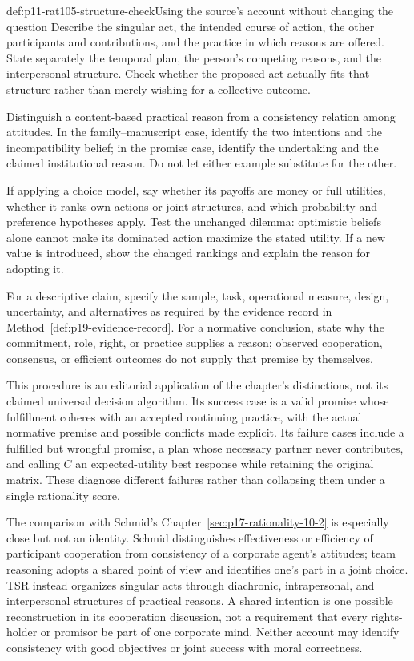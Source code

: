 \begin{hbmethod}{def:p11-rat105-structure-check}{Using the source's account without changing the question}
Describe the singular act, the intended course of action, the other
participants and contributions, and the practice in which reasons are
offered. State separately the temporal plan, the person's competing
reasons, and the interpersonal structure. Check whether the proposed
act actually fits that structure rather than merely wishing for a
collective outcome.

Distinguish a content-based practical reason from a consistency relation
among attitudes. In the family--manuscript case, identify the two
intentions and the incompatibility belief; in the promise case, identify
the undertaking and the claimed institutional reason. Do not let either
example substitute for the other.

If applying a choice model, say whether its payoffs are money or full
utilities, whether it ranks own actions or joint structures, and which
probability and preference hypotheses apply. Test the unchanged
dilemma: optimistic beliefs alone cannot make its dominated action
maximize the stated utility. If a new value is introduced, show the
changed rankings and explain the reason for adopting it.

For a descriptive claim, specify the sample, task, operational measure,
design, uncertainty, and alternatives as required by the evidence record
in Method~\ref{def:p19-evidence-record}. For a normative conclusion,
state why the commitment, role, right, or practice supplies a reason;
observed cooperation, consensus, or efficient outcomes do not supply
that premise by themselves.
\end{hbmethod}

This procedure is an editorial application of the chapter's distinctions,
not its claimed universal decision algorithm. Its success case is a
valid promise whose fulfillment coheres with an accepted continuing
practice, with the actual normative premise and possible conflicts
made explicit. Its failure cases include a fulfilled but wrongful
promise, a plan whose necessary partner never contributes, and calling
\(C\) an expected-utility best response while retaining the original
matrix. These diagnose different failures rather than collapsing them
under a single rationality score.

The comparison with Schmid's
Chapter~\ref{sec:p17-rationality-10-2} is especially close but not an
identity. Schmid distinguishes effectiveness or efficiency of participant
cooperation from consistency of a corporate agent's attitudes; team
reasoning adopts a shared point of view and identifies one's part in a
joint choice. TSR instead organizes singular acts through diachronic,
intrapersonal, and interpersonal structures of practical reasons. A
shared intention is one possible reconstruction in its cooperation
discussion, not a requirement that every rights-holder or promisor be
part of one corporate mind. Neither account may identify consistency
with good objectives or joint success with moral correctness.

